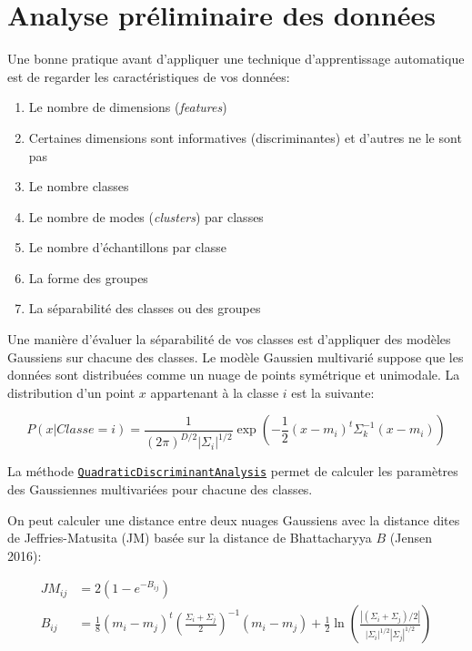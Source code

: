 \documentclass[
  11pt,
  letterpaper,
  open=any,
  twoside=false,
  french]{scrbook}
\begin{document}
\section{Analyse préliminaire des
données}\label{analyse-pruxe9liminaire-des-donnuxe9es}

Une bonne pratique avant d'appliquer une technique d'apprentissage
automatique est de regarder les caractéristiques de vos données:

\begin{enumerate}
\def\labelenumi{\arabic{enumi}.}
\item
  Le nombre de dimensions (\emph{features})
\item
  Certaines dimensions sont informatives (discriminantes) et d'autres ne
  le sont pas
\item
  Le nombre classes
\item
  Le nombre de modes (\emph{clusters}) par classes
\item
  Le nombre d'échantillons par classe
\item
  La forme des groupes
\item
  La séparabilité des classes ou des groupes
\end{enumerate}

Une manière d'évaluer la séparabilité de vos classes est d'appliquer des
modèles Gaussiens sur chacune des classes. Le modèle Gaussien multivarié
suppose que les données sont distribuées comme un nuage de points
symétrique et unimodale. La distribution d'un point \(x\) appartenant à
la classe \(i\) est la suivante:

\[
P(x | Classe=i) = \frac{1}{(2\pi)^{D/2} |\Sigma_i|^{1/2}}\exp\left(-\frac{1}{2} (x-m_i)^t \Sigma_k^{-1} (x-m_i)\right)
\]

La méthode
\href{https://scikit-learn.org/stable/modules/generated/sklearn.discriminant_analysis.QuadraticDiscriminantAnalysis.html}{\texttt{QuadraticDiscriminantAnalysis}}
permet de calculer les paramètres des Gaussiennes multivariées pour
chacune des classes.

On peut calculer une distance entre deux nuages Gaussiens avec la
distance dites de Jeffries-Matusita (JM) basée sur la distance de
Bhattacharyya \(B\) (Jensen 2016):

\[
\begin{aligned}
JM_{ij} &= 2(1 - e^{-B_{ij}}) \\
B_{ij} &= \frac{1}{8}(m_i - m_j)^t \left( \frac{\Sigma_i + \Sigma_j}{2} \right)^{-1} (m_i - m_j) + \frac{1}{2} \ln \left( \frac{|(\Sigma_i + \Sigma_j)/2|}{|\Sigma_i|^{1/2} |\Sigma_j|^{1/2}} \right)
\end{aligned}
\]
\end{document}
